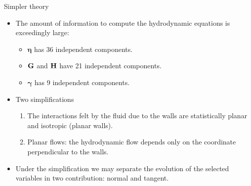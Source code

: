 \documentclass{beamer}
\begin{document}
\begin{frame}{Simpler theory}
  \begin{itemize}
    \item<1-> The amount of information to compute the hydrodynamic equations is exceedingly large:
      \begin{itemize}
        \item $\boldsymbol{\eta}$ has 36 independent components. 
        \item ${\bf G}$ and ${\bf H}$ have 21 independent components. 
        \item $\boldsymbol{\gamma}$ has 9 independent components. 
      \end{itemize}
    \item<2-> Two simplifications
      \begin{enumerate}
    \item The interactions felt by the fluid due to the walls are statistically planar and isotropic (planar walls).
    \item Planar flows: the hydrodynamic flow depends only on the coordinate perpendicular to the walls. 
      \end{enumerate}
    \item<3-> Under the simplification we may separate the evolution of the selected variables in two contribution: normal and tangent.
    \end{itemize}
\end{frame}
\end{document}
